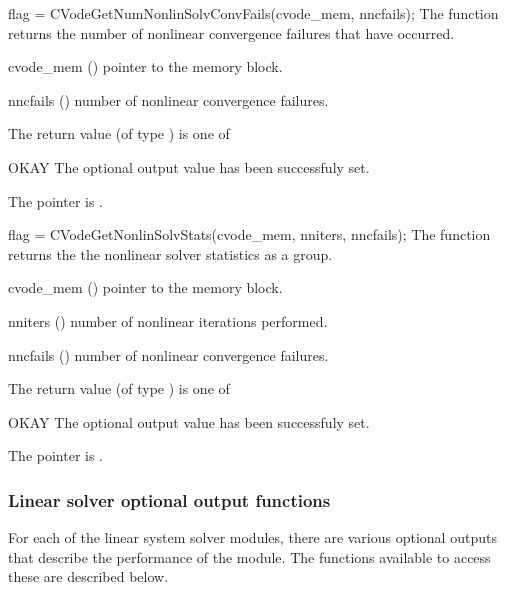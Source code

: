 {}
{
  flag = CVodeGetNumNonlinSolvConvFails(cvode\_mem, nncfails);
}
{
  The function  returns the
  number of nonlinear convergence failures that have occurred.
}
{
  \begin{args}
  \item[cvode\_mem] ()
    pointer to the {\cvodes} memory block.
  \item[nncfails] ()
    number of nonlinear convergence failures.
  \end{args}
}
{
  The return value  (of type ) is one of
  \begin{args}
  \item[OKAY] 
    The optional output value has been successfuly set.
  \item[\Id{CVG\_NO\_MEM}]
    The  pointer is .
  \end{args}
}
{}
{
  flag = CVodeGetNonlinSolvStats(cvode\_mem, nniters, nncfails);
}
{
  The function  returns the the
  {\cvodes} nonlinear solver statistics as a group.
}
{
  \begin{args}
  \item[cvode\_mem] ()
    pointer to the {\cvodes} memory block.
  \item[nniters] ()
    number of nonlinear iterations performed.
  \item[nncfails] ()
    number of nonlinear convergence failures.
  \end{args}
}
{
  The return value  (of type ) is one of
  \begin{args}
  \item[OKAY] 
    The optional output value has been successfuly set.
  \item[\Id{CVG\_NO\_MEM}]
    The  pointer is .
  \end{args}
}
{}

\subsubsection{Linear solver optional output functions}

For each of the linear system solver modules, there are various optional 
outputs that describe the performance of the module. The functions available 
to access these are described below.

